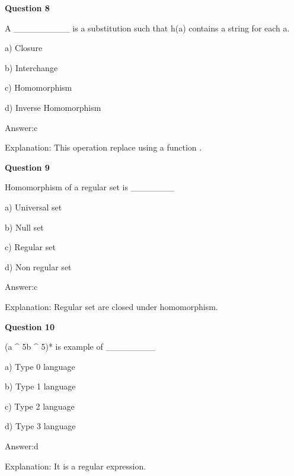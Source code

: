 \documentclass{article}
\begin{document}
\begin{mdframed}[linewidth=1pt, roundcorner=5pt, linecolor=gray!30, backgroundcolor=gray!5]
\textbf{Question 8} 

A \_\_\_\_\_\_\_\_\_ is a substitution such that h(a) contains a string for each a.

a) Closure

b) Interchange

c) Homomorphism

d) Inverse Homomorphism
\vspace{5pt} \par
\begin{tcolorbox}[colback=green!5, colframe=green!40!black, title=Solution]
Answer:c

Explanation: This operation replace using a function .
\end{tcolorbox}
\end{mdframed}

\begin{mdframed}[linewidth=1pt, roundcorner=5pt, linecolor=gray!30, backgroundcolor=gray!5]
\textbf{Question 9} 

Homomorphism of a regular set is \_\_\_\_\_\_\_

a) Universal set

b) Null set

c) Regular set

d) Non regular set
\vspace{5pt} \par
\begin{tcolorbox}[colback=green!5, colframe=green!40!black, title=Solution]
Answer:c

Explanation: Regular set are closed under homomorphism.
\end{tcolorbox}
\end{mdframed}
\newpage

\begin{mdframed}[linewidth=1pt, roundcorner=5pt, linecolor=gray!30, backgroundcolor=gray!5]
\textbf{Question 10} 

(a \textasciicircum{} 5b \textasciicircum{} 5)* is example of \_\_\_\_\_\_\_\_

a) Type 0 language

b) Type 1 language

c) Type 2 language

d) Type 3 language
\vspace{5pt} \par
\begin{tcolorbox}[colback=green!5, colframe=green!40!black, title=Solution]
Answer:d

Explanation: It is a regular expression.
\end{tcolorbox}
\end{mdframed}
\end{document}
